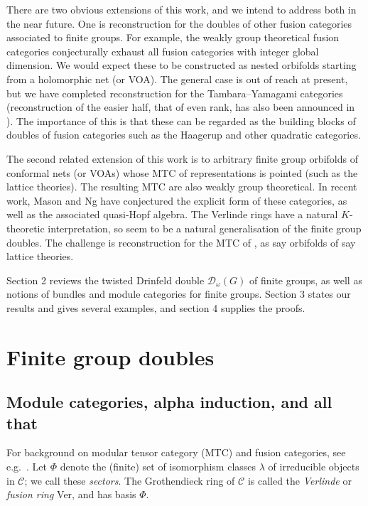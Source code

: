 \documentclass[12pt]{article}
\numberwithin{equation}{section}
\def\cC            {{\mathcal{C}}}
\def\cD            {{\mathcal{D}}}
\begin{document}
There are two obvious extensions of this work, and we intend to address both in the near future. One is reconstruction for the doubles of other fusion categories associated to finite groups. For example, the weakly group theoretical fusion categories conjecturally exhaust all fusion categories with integer global dimension. We would expect these to be constructed as nested orbifolds starting from a holomorphic net (or VOA). The general case is out of reach at present, but we have completed reconstruction for the  Tambara--Yamagami categories (reconstruction of the easier half, that of even rank, has also been announced in \cite{Bis}). The importance of this is that these can be regarded as the building blocks of doubles of fusion categories such as the Haagerup and other quadratic categories.

The second related extension of this work is to arbitrary finite group orbifolds of conformal nets (or VOAs) whose MTC
of representations is pointed (such as the lattice theories). The resulting MTC are also weakly group theoretical. In recent work, Mason and Ng \cite{MN} have conjectured the explicit form of these categories, as well as the associated quasi-Hopf algebra. The Verlinde rings have a natural $K$-theoretic interpretation, so seem to be a natural generalisation of the finite group doubles. The challenge is reconstruction for the MTC of \cite{MN},  as say orbifolds of say lattice theories.

Section 2 reviews the twisted Drinfeld double $\cD_\omega(G)$ of finite groups, as well as notions of bundles  and module categories for finite groups. Section 3 states our results and gives several examples, and section 4 supplies the proofs.





\section{Finite group doubles}


\subsection{Module categories, alpha induction, and all that}


For background on {modular tensor category} (MTC) and fusion categories, see e.g.\ \cite{EGNO}.
 Let $\Phi$ denote the (finite) set of {isomorphism classes $\lambda$ of} irreducible objects in $\cC$; we call these \textit{sectors}.
The Grothendieck ring of $\cC$ is called the \textit{Verlinde} or \textit{fusion ring} Ver, {and has 
basis $\Phi$}.  
\end{document}

